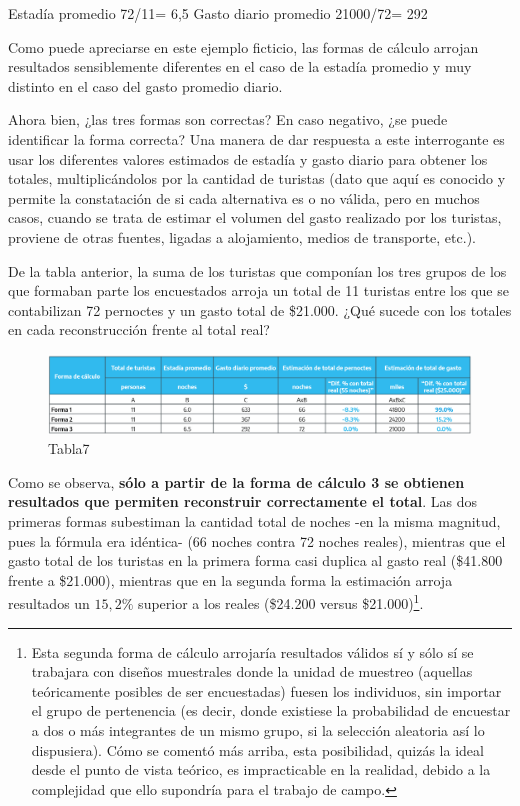 \documentclass[
]{book}
\begin{document}
Estadía promedio 72/11= 6,5 Gasto diario promedio 21000/72= 292

Como puede apreciarse en este ejemplo ficticio, las formas de cálculo arrojan resultados sensiblemente diferentes en el caso de la estadía promedio y muy distinto en el caso del gasto promedio diario.

Ahora bien, ¿las tres formas son correctas? En caso negativo, ¿se puede identificar la forma correcta? Una manera de dar respuesta a este interrogante es usar los diferentes valores estimados de estadía y gasto diario para obtener los totales, multiplicándolos por la cantidad de turistas (dato que aquí es conocido y permite la constatación de si cada alternativa es o no válida, pero en muchos casos, cuando se trata de estimar el volumen del gasto realizado por los turistas, proviene de otras fuentes, ligadas a alojamiento, medios de transporte, etc.).

De la tabla anterior, la suma de los turistas que componían los tres grupos de los que formaban parte los encuestados arroja un total de 11 turistas entre los que se contabilizan 72 pernoctes y un gasto total de \$21.000. ¿Qué sucede con los totales en cada reconstrucción frente al total real?

\begin{figure}

{\centering \includegraphics[width=1\linewidth]{imagenes/tabla_7} 

}

\caption{Tabla7}\label{fig:Totalreal}
\end{figure}

Como se observa, \textbf{sólo a partir de la forma de cálculo 3 se obtienen resultados que permiten reconstruir correctamente el total}. Las dos primeras formas subestiman la cantidad total de noches -en la misma magnitud, pues la fórmula era idéntica- (66 noches contra 72 noches reales), mientras que el gasto total de los turistas en la primera forma casi duplica al gasto real (\$41.800 frente a \$21.000), mientras que en la segunda forma la estimación arroja resultados un \(15,2\%\) superior a los reales (\$24.200 versus \$21.000)\footnote{Esta segunda forma de cálculo arrojaría resultados válidos sí y sólo sí se trabajara con diseños muestrales donde la unidad de muestreo (aquellas teóricamente posibles de ser encuestadas) fuesen los individuos, sin importar el grupo de pertenencia (es decir, donde existiese la probabilidad de encuestar a dos o más integrantes de un mismo grupo, si la selección aleatoria así lo dispusiera). Cómo se comentó más arriba, esta posibilidad, quizás la ideal desde el punto de vista teórico, es impracticable en la realidad, debido a la complejidad que ello supondría para el trabajo de campo.}.
\end{document}
